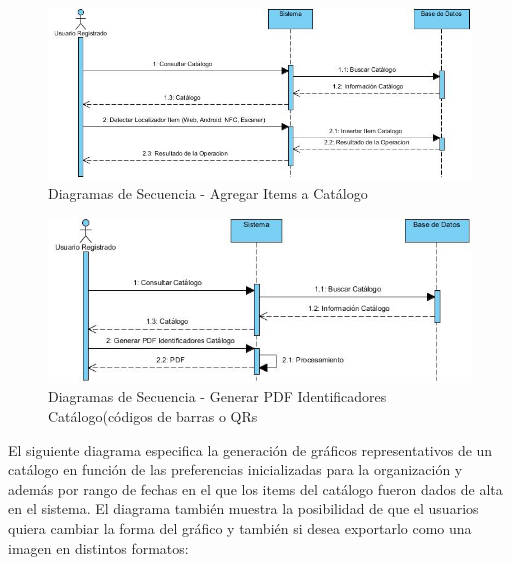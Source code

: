 \documentclass[a4paper,11pt]{book}
\begin{document}
\begin{figure}[H] 
\centering 
\includegraphics[scale=0.50]{imagenes/secuencia/Insertar_Items_Catalogo.jpg}
\caption{ Diagramas de Secuencia - Agregar Items a Catálogo\cite{diagrama}  }  
\end{figure}

\begin{figure}[H] 
\centering 
\includegraphics[scale=0.50]{imagenes/secuencia/Generar_PDF_Identificadores_Catalogo.jpg}
\caption{ Diagramas de Secuencia - Generar PDF Identificadores Catálogo(códigos de barras o QRs\cite{diagrama}  }  
\end{figure}

El siguiente diagrama especifica la generación de gráficos representativos de un catálogo en función de las preferencias inicializadas para la organización y además por rango de fechas en el que los items del catálogo fueron dados de alta en el sistema. El diagrama también muestra la posibilidad de que el usuarios quiera cambiar la forma del gráfico y también si desea exportarlo como una imagen en distintos formatos:
\end{document}
